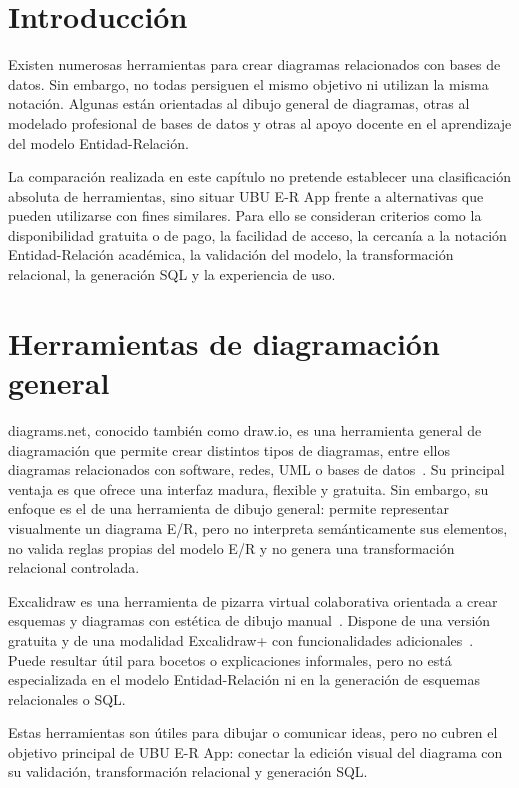 
\section{Introducción}

Existen numerosas herramientas para crear diagramas relacionados con bases de datos. Sin embargo, no todas persiguen el mismo objetivo ni utilizan la misma notación. Algunas están orientadas al dibujo general de diagramas, otras al modelado profesional de bases de datos y otras al apoyo docente en el aprendizaje del modelo Entidad-Relación.

La comparación realizada en este capítulo no pretende establecer una clasificación absoluta de herramientas, sino situar UBU E-R App frente a alternativas que pueden utilizarse con fines similares. Para ello se consideran criterios como la disponibilidad gratuita o de pago, la facilidad de acceso, la cercanía a la notación Entidad-Relación académica, la validación del modelo, la transformación relacional, la generación SQL y la experiencia de uso.

\section{Herramientas de diagramación general}

diagrams.net, conocido también como draw.io, es una herramienta general de diagramación que permite crear distintos tipos de diagramas, entre ellos diagramas relacionados con software, redes, UML o bases de datos~\cite{drawio}. Su principal ventaja es que ofrece una interfaz madura, flexible y gratuita. Sin embargo, su enfoque es el de una herramienta de dibujo general: permite representar visualmente un diagrama E/R, pero no interpreta semánticamente sus elementos, no valida reglas propias del modelo E/R y no genera una transformación relacional controlada.

Excalidraw es una herramienta de pizarra virtual colaborativa orientada a crear esquemas y diagramas con estética de dibujo manual~\cite{excalidraw}. Dispone de una versión gratuita y de una modalidad Excalidraw+ con funcionalidades adicionales~\cite{excalidrawPricing}. Puede resultar útil para bocetos o explicaciones informales, pero no está especializada en el modelo Entidad-Relación ni en la generación de esquemas relacionales o SQL.

Estas herramientas son útiles para dibujar o comunicar ideas, pero no cubren el objetivo principal de UBU E-R App: conectar la edición visual del diagrama con su validación, transformación relacional y generación SQL.

